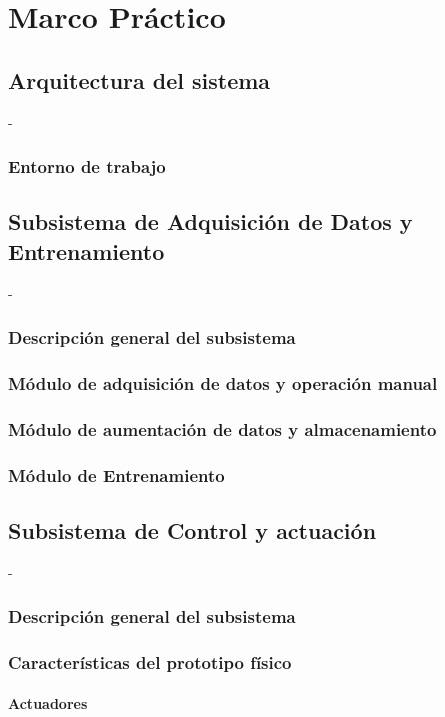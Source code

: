 \chapter{Marco Práctico} \label{ch:m_practico}
\section{Arquitectura del sistema}
-
    \subsection{Entorno de trabajo}

\section{Subsistema de Adquisición de Datos y Entrenamiento}
-
    \subsection{Descripción general del subsistema}

    \subsection{Módulo de adquisición de datos y operación manual}

    \subsection{Módulo de aumentación de datos y almacenamiento}

    \subsection{Módulo de Entrenamiento}

\section{Subsistema de Control y actuación}
-
    \subsection{Descripción general del subsistema}

    \subsection{Características del prototipo físico}
        \subsubsection{Actuadores}

